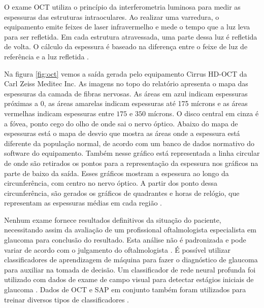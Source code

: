 \documentclass[conference]{IEEEtran}
\begin{document}
O exame OCT utiliza o princípio da interferometria luminosa para medir as espessuras das estruturas intraoculares. Ao realizar uma varredura, o equipamento emite feixes de laser infravermelho e mede o tempo que a luz leva para ser refletida. Em cada estrutura atravessada, uma parte dessa luz é refletida de volta. O cálculo da espessura é baseado na diferença entre o feixe de luz de referência e a luz refletida \cite{huang1991}. 

Na figura \ref{fig:oct} vemos a saída gerada pelo equipamento Cirrus HD-OCT da Carl Zeiss Meditec Inc. As imagens no topo do relatório apresenta o mapa das espessuras da camada de fibras nervosas. As áreas em azul indicam espessuras próximas a $0$, as áreas amarelas indicam espessuras até 175 mícrons e as áreas vermelhas indicam espessuras entre $175$ e $350$ mícrons. O disco central em cinza é a fóvea, ponto cego do olho de onde sai o nervo óptico. Abaixo do mapa de espessuras está o mapa de desvio que mostra as áreas onde a espessura está diferente da população normal, de acordo com um banco de dados normativo do software do equipamento. Também nesse gráfico está representada a linha circular de onde são retirados os pontos para a representação da espessura nos gráficos na parte de baixo da saída. Esses gráficos mostram a espessura ao longo da circunferência, com centro no nervo óptico. A partir dos ponto dessa circunferência, são gerados os gráficos de quadrantes e horas de relógio, que representam as espessuras médias em cada região \cite{Populacoes2009}.

Nenhum exame fornece resultados definitivos da situação do paciente, necessitando assim da avaliação de um
profissional oftalmologista especialista em glaucoma para conclusão do resultado. Esta análise não é padronizada e pode variar de acordo com o julgamento do oftalmologista \cite{kroese2003}. É possível utilizar classificadores de aprendizagem de máquina para fazer o diagnóstico de glaucoma para auxiliar na tomada de decisão. Um classificador de rede neural profunda foi utilizado com dados de exame de campo visual para detectar estágios iniciais de glaucoma \cite{Asaoka2016}. Dados de OCT e SAP em conjunto também foram utilizados para treinar diversos tipos de classificadores \cite{Populacoes2009,bowd2008}.
\end{document}
